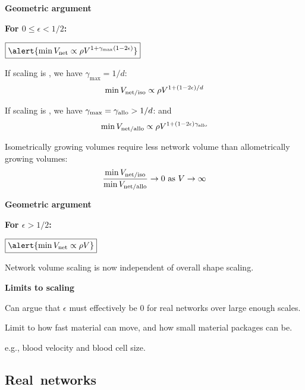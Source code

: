   \textbf{Geometric argument}

  \textbf{For $0 \le \epsilon < 1/2$:}
    
     
      $
      \boxed{\alert{
          \min V_{\textnormal{net}} 
          \propto
          \rho V^{1+\gamma_{\max}(1-2\epsilon)} 
        }}
      $
     
      If scaling is , we have $\gamma_{\max} = 1/d$:
      $$
      \min V_{\textnormal{net/iso}} 
      \propto
      \rho V^{1+(1-2\epsilon)/d}
      $$
     
      If scaling is , we have
      $\gamma_{\max} = \gamma_{\textnormal{allo}} > 1/d$:
      and 
      $$
      \min V_{\textnormal{net/allo}} 
      \propto
      \rho V^{1+(1-2\epsilon)\gamma_{\textnormal{allo}}}
      $$
     
      Isometrically growing volumes 
      \alert{require less network volume} 
      than allometrically growing volumes:
      $$
      \frac{\min V_{\textnormal{net/iso}}}{\min V_{\textnormal{net/allo}}} \rightarrow 0 
      \mbox{\ as $V \rightarrow \infty$}
      $$
        
    
  

  \textbf{Geometric argument}

  \textbf{For $\epsilon > 1/2$:}
    
     
      $
      \boxed{\alert{
          \min V_{\textnormal{net}} 
          \propto
          \rho V
        }}
      $
     
      Network volume scaling is now independent 
      of overall shape scaling.
    
  

  \medskip

  \textbf{Limits to scaling}
    
     
      Can argue that $\epsilon$ must effectively be 0
      for real networks over large enough scales.
     
      Limit to how fast material can move,
      and how small material packages can be.
     
      e.g., blood velocity and blood cell size.
    
  


\subsection{Real\ networks}

